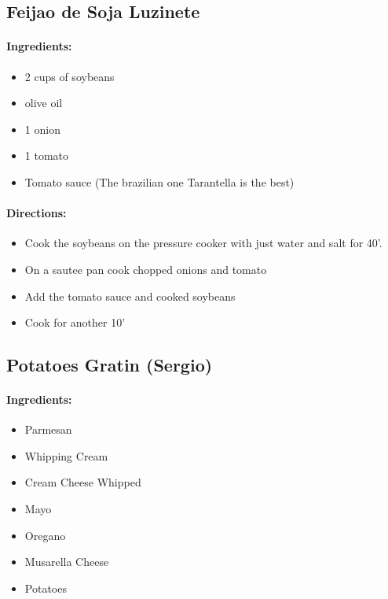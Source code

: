 \documentclass{article}
\begin{document}
\subsection{Feijao de Soja Luzinete}

\paragraph{Ingredients:}

\begin{itemize}
	\item 2 cups of soybeans
	\item olive oil
	\item 1 onion
	\item 1 tomato
	\item Tomato sauce (The brazilian one Tarantella is the best)
\end{itemize}

\paragraph{Directions:}
\begin{itemize}
	\item Cook the soybeans on the pressure cooker with just water and salt for 40'.
	\item On a sautee pan cook chopped onions and tomato
	\item Add the tomato sauce and cooked soybeans
	\item Cook for another 10'
\end{itemize}

\subsection{Potatoes Gratin (Sergio)}

\paragraph{Ingredients:}

\begin{itemize}
	\item Parmesan
	\item Whipping Cream
	\item Cream Cheese Whipped
	\item Mayo
	\item Oregano
	\item Musarella Cheese
	\item Potatoes
\end{itemize}
\end{document}
